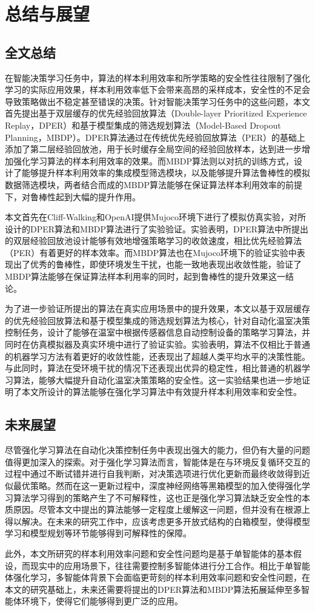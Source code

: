
\chapter{总结与展望}\label{chap:summary}

\section{全文总结}

在智能决策学习任务中，算法的样本利用效率和所学策略的安全性往往限制了强化学习的实际应用效果，样本利用效率低下会带来高昂的采样成本，安全性的不足会导致策略做出不稳定甚至错误的决策。针对智能决策学习任务中的这些问题，本文首先提出基于双层缓存的优先经验回放算法（Double-layer Prioritized Experience Replay，DPER）和基于模型集成的筛选规划算法（Model-Based Dropout Planning，MBDP）。DPER算法通过在传统优先经验回放算法（PER）的基础上添加了第二层经验回放池，用于长时缓存全局空间的经验回放样本，达到进一步增加强化学习算法的样本利用效率的效果。而MBDP算法则以对抗的训练方式，设计了能够提升样本利用效率的集成模型筛选模块，以及能够提升算法鲁棒性的模拟数据筛选模块，两者结合而成的MBDP算法能够在保证算法样本利用效率的前提下，对鲁棒性起到大幅的提升作用。

本文首先在Cliff-Walking和OpenAI提供Mujoco环境下进行了模拟仿真实验，对所设计的DPER算法和MBDP算法进行了实验验证。实验表明，DPER算法中所提出的双层经验回放池设计能够有效地增强策略学习的收敛速度，相比优先经验算法（PER）有着更好的样本效率。而MBDP算法也在Mujoco环境下的验证实验中表现出了优秀的鲁棒性，即使环境发生干扰，也能一致地表现出收敛性能，验证了MBDP算法能够在保证算法样本利用率的同时，起到鲁棒性的提升效果这一结论。

为了进一步验证所提出的算法在真实应用场景中的提升效果，本文以基于双层缓存的优先经验回放算法和基于模型集成的筛选规划算法为核心，针对自动化温室决策控制任务，设计了能够在温室中根据传感器信息自动控制设备的策略学习算法，并同时在仿真模拟器及真实环境中进行了验证实验。实验表明，算法不仅相比于普通的机器学习方法有着更好的收敛性能，还表现出了超越人类平均水平的决策性能。与此同时，算法在受环境干扰的情况下还表现出优异的稳定性，相比普通的机器学习算法，能够大幅提升自动化温室决策策略的安全性。这一实验结果也进一步地证明了本文所设计的算法能够在强化学习算法中有效提升样本利用效率和安全性。

\section{未来展望}

尽管强化学习算法在自动化决策控制任务中表现出强大的能力，但仍有大量的问题值得更加深入的探索。对于强化学习算法而言，智能体是在与环境反复循环交互的过程中通过不断试错并进行自我判断，对决策选项进行优化更新而最终收敛得到近似最优策略。然而在这一更新过程中，深度神经网络等黑箱模型的加入使得强化学习算法学习得到的策略产生了不可解释性，这也正是强化学习算法缺乏安全性的本质原因。尽管本文中提出的算法能够一定程度上缓解这一问题，但并没有在根源上得以解决。在未来的研究工作中，应该考虑更多开放式结构的白箱模型，使得模型学习和模型规划等环节能够得到可解释性的保障。

此外，本文所研究的样本利用效率问题和安全性问题均是基于单智能体的基本假设，而现实中的应用场景下，往往需要控制多智能体进行分工合作。相比于单智能体强化学习，多智能体背景下会面临更苛刻的样本利用效率问题和安全性问题，在本文的研究基础上，未来还需要将提出的DPER算法和MBDP算法拓展延伸至多智能体环境下，使得它们能够得到更广泛的应用。